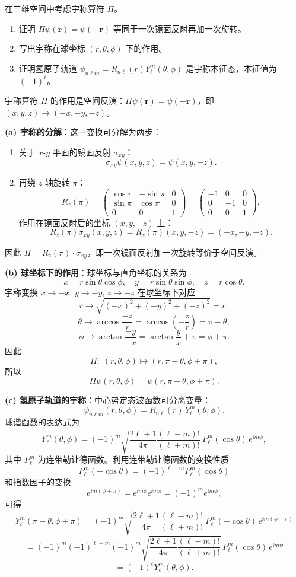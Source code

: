 \begin{question}
在三维空间中考虑宇称算符 $\Pi$。
\begin{enumerate}
\item 证明 $\Pi\psi(\mathbf r)=\psi(-\mathbf r)$ 等同于一次镜面反射再加一次旋转。
\item 写出宇称在球坐标 $(r,\theta,\phi)$ 下的作用。
\item 证明氢原子轨道 $\psi_{n\ell m}=R_{n\ell}(r)Y_\ell^m(\theta,\phi)$ 是宇称本征态，本征值为 $(-1)^\ell$。
\end{enumerate}
\end{question}
\begin{solution}
	宇称算符 $\Pi$ 的作用是空间反演：$\Pi\psi(\mathbf r)=\psi(-\mathbf r)$，即 $(x,y,z)\to(-x,-y,-z)$。

	\textbf{(a) 宇称的分解}：这一变换可分解为两步：
	\begin{enumerate}
	\item 关于 $x$-$y$ 平面的镜面反射 $\sigma_{xy}$：
	\[
	\sigma_{xy}\psi(x,y,z)=\psi(x,y,-z).
	\]
	\item 再绕 $z$ 轴旋转 $\pi$：
	\[
	R_z(\pi)=\begin{pmatrix}\cos\pi&-\sin\pi&0\\\sin\pi&\cos\pi&0\\0&0&1\end{pmatrix}
	=\begin{pmatrix}-1&0&0\\0&-1&0\\0&0&1\end{pmatrix},
	\]
	作用在镜面反射后的坐标 $(x,y,-z)$ 上：
	\[
	R_z(\pi)\sigma_{xy}(x,y,z)=R_z(\pi)(x,y,-z)=(-x,-y,-z).
	\]
	\end{enumerate}
	因此 $\Pi = R_z(\pi) \cdot \sigma_{xy}$，即一次镜面反射加一次旋转等价于空间反演。

	\textbf{(b) 球坐标下的作用}：球坐标与直角坐标的关系为
	\[
	x = r\sin\theta\cos\phi,\quad y = r\sin\theta\sin\phi,\quad z = r\cos\theta.
	\]
	宇称变换 $x\to -x,\,y\to -y,\,z\to -z$ 在球坐标下对应
	\[
	r\to\sqrt{(-x)^2+(-y)^2+(-z)^2}=r,
	\]
	\[
	\theta\to\arccos\frac{-z}{r}=\arccos\!\left(-\frac{z}{r}\right)=\pi-\theta,
	\]
	\[
	\phi\to\arctan\frac{-y}{-x}=\arctan\frac{y}{x}+\pi=\phi+\pi.
	\]
	因此
	\[
	\Pi:\;(r,\theta,\phi)\longmapsto (r,\pi-\theta,\phi+\pi),
	\]
	所以
	\[
	\Pi\psi(r,\theta,\phi)=\psi(r,\pi-\theta,\phi+\pi).
	\]

	\textbf{(c) 氢原子轨道的宇称}：中心势定态波函数可分离变量：
	\[
	\psi_{n\ell m}(r,\theta,\phi)=R_{n\ell}(r)\,Y_\ell^m(\theta,\phi).
	\]
	球谐函数的表达式为
	\[
	Y_\ell^m(\theta,\phi)=(-1)^m\sqrt{\frac{2\ell+1}{4\pi}\frac{(\ell-m)!}{(\ell+m)!}}\,P_\ell^m(\cos\theta)\,e^{\ii m\phi},
	\]
	其中 $P_\ell^m$ 为连带勒让德函数。利用连带勒让德函数的变换性质
	\[
	P_\ell^m(-\cos\theta)=(-1)^{\ell-m}P_\ell^m(\cos\theta)
	\]
	和指数因子的变换
	\[
	e^{\ii m(\phi+\pi)}=e^{\ii m\phi}e^{\ii m\pi}=(-1)^m e^{\ii m\phi},
	\]
	可得
	\[
	Y_\ell^m(\pi-\theta,\phi+\pi)=(-1)^m\sqrt{\frac{2\ell+1}{4\pi}\frac{(\ell-m)!}{(\ell+m)!}}\,P_\ell^m(-\cos\theta)\,e^{\ii m(\phi+\pi)}
	\]
	\[
	=(-1)^m(-1)^{\ell-m}(-1)^m\sqrt{\frac{2\ell+1}{4\pi}\frac{(\ell-m)!}{(\ell+m)!}}\,P_\ell^m(\cos\theta)\,e^{\ii m\phi}
	\]
	\[
	=(-1)^\ell Y_\ell^m(\theta,\phi).
	\]


\end{solution}
